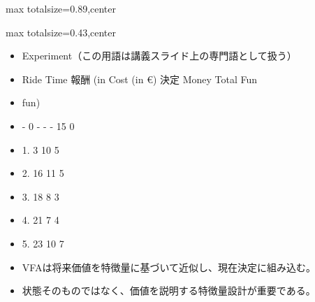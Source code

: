 \begin{minipage}[t]{0.58\textwidth}
\begin{adjustbox}{max totalsize={\textwidth}{0.89\textheight},center}
\begin{minipage}{\textwidth}
\end{minipage}
\end{adjustbox}
\end{minipage}


\clearpage
{}
\begin{minipage}[t]{0.405\textwidth}
\begin{adjustbox}{max totalsize={\textwidth}{0.43\textheight},center}
\begin{minipage}{\textwidth}\scriptsize
{}\begin{itemize}
\item Experiment（この用語は講義スライド上の専門語として扱う）
\item Ride Time 報酬 (in Cost (in €) 決定 Money Total Fun
\item fun)
\item - 0 - - - 15 0
\item 1. 3 10 5
\item 2. 16 11 5
\item 3. 18 8 3
\item 4. 21 7 4
\item 5. 23 10 7
\end{itemize}\begin{itemize}
\item VFAは将来価値を特徴量に基づいて近似し、現在決定に組み込む。
\item 状態そのものではなく、価値を説明する特徴量設計が重要である。
\end{itemize}
\end{minipage}
\end{adjustbox}
\end{minipage}\hfill
